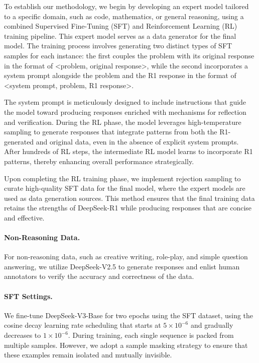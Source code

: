\documentclass[11pt, a4paper, logo, copyright, nonumbering]{deepseek}
\newcommand{\dsviii}{DeepSeek-V3}
\begin{document}
\begin{CJK*}{UTF8}{gbsn}
To establish our methodology, we begin by developing an expert model tailored to a specific domain, such as code, mathematics, or general reasoning, using a combined Supervised Fine-Tuning (SFT) and Reinforcement Learning (RL) training pipeline. 
This expert model serves as a data generator for the final model. 
The training process involves generating two distinct types of SFT samples for each instance: the first couples the problem with its original response in the format of <problem, original response>, while the second incorporates a system prompt alongside the problem and the R1 response in the format of <system prompt, problem, R1 response>.

The system prompt is meticulously designed to include instructions that guide the model toward producing responses enriched with mechanisms for reflection and verification. 
During the RL phase, the model leverages high-temperature sampling to generate responses that integrate patterns from both the R1-generated and original data, even in the absence of explicit system prompts. 
After hundreds of RL steps, the intermediate RL model learns to incorporate R1 patterns, thereby enhancing overall performance strategically.

Upon completing the RL training phase, we implement rejection sampling to curate high-quality SFT data for the final model, where the expert models are used as data generation sources. 
This method ensures that the final training data retains the strengths of DeepSeek-R1 while producing responses that are concise and effective.

\paragraph{Non-Reasoning Data.} 
For non-reasoning data, such as creative writing, role-play, and simple question answering, we utilize DeepSeek-V2.5 to generate responses and enlist human annotators to verify the accuracy and correctness of the data.

\paragraph{SFT Settings.} 
We fine-tune \dsviii{}-Base for two epochs using the SFT dataset, using the cosine decay learning rate scheduling that starts at $5 \times 10^{-6}$ and gradually decreases to $1 \times 10^{-6}$. 
During training, each single sequence is packed from multiple samples. 
However, we adopt a sample masking strategy to ensure that these examples remain isolated and mutually invisible.


\end{CJK*}
\end{document}
